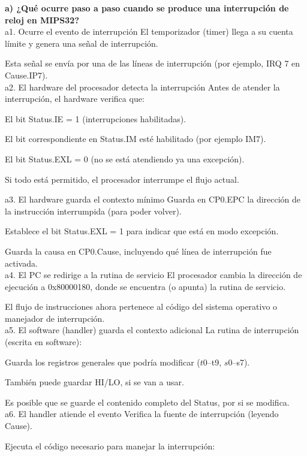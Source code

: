 \documentclass[]{article}
\begin{document}
\textbf{a) ¿Qué ocurre paso a paso cuando se produce una interrupción de reloj en MIPS32?} \\

 a1. Ocurre el evento de interrupción
El temporizador (timer) llega a su cuenta límite y genera una señal de interrupción.

Esta señal se envía por una de las líneas de interrupción (por ejemplo, IRQ 7 en Cause.IP7). \\

 a2. El hardware del procesador detecta la interrupción
Antes de atender la interrupción, el hardware verifica que:

El bit Status.IE = 1 (interrupciones habilitadas).

El bit correspondiente en Status.IM esté habilitado (por ejemplo IM7).

El bit Status.EXL = 0 (no se está atendiendo ya una excepción).

Si todo está permitido, el procesador interrumpe el flujo actual.

 a3. El hardware guarda el contexto mínimo
Guarda en CP0.EPC la dirección de la instrucción interrumpida (para poder volver).

Establece el bit Status.EXL = 1 para indicar que está en modo excepción.

Guarda la causa en CP0.Cause, incluyendo qué línea de interrupción fue activada. \\

 a4. El PC se redirige a la rutina de servicio
El procesador cambia la dirección de ejecución a 0x80000180, donde se encuentra (o apunta) la rutina de servicio.

El flujo de instrucciones ahora pertenece al código del sistema operativo o manejador de interrupción. \\

 a5. El software (handler) guarda el contexto adicional
La rutina de interrupción (escrita en software):

Guarda los registros generales que podría modificar ($t0–$t9, $s0–$s7).

También puede guardar HI/LO, si se van a usar.

Es posible que se guarde el contenido completo del Status, por si se modifica. \\

 a6. El handler atiende el evento
Verifica la fuente de interrupción (leyendo Cause).

Ejecuta el código necesario para manejar la interrupción:
\end{document}
